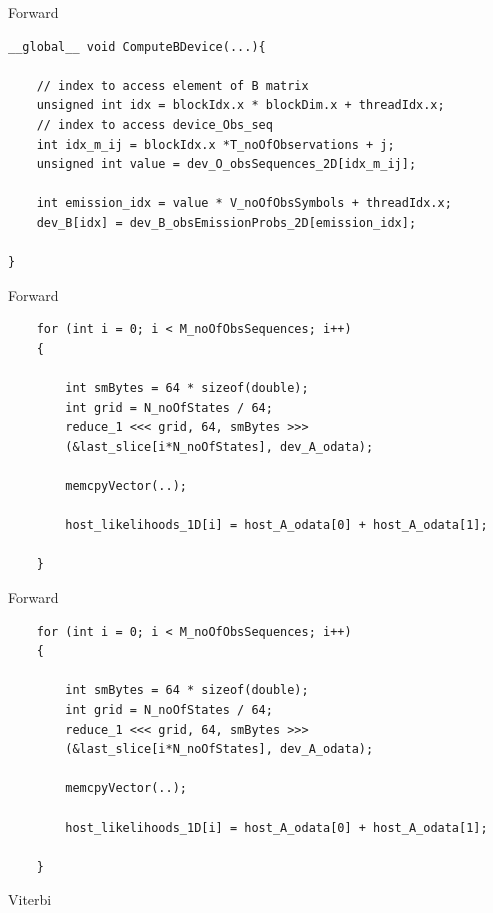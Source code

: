 \documentclass[11pt]{beamer}
\begin{document}
\begin{frame}[fragile]{Forward}
\begin{verbatim}
__global__ void ComputeBDevice(...){
	
	// index to access element of B matrix
	unsigned int idx = blockIdx.x * blockDim.x + threadIdx.x;
	// index to access device_Obs_seq
	int idx_m_ij = blockIdx.x *T_noOfObservations + j;
	unsigned int value = dev_O_obsSequences_2D[idx_m_ij];

	int emission_idx = value * V_noOfObsSymbols + threadIdx.x;
	dev_B[idx] = dev_B_obsEmissionProbs_2D[emission_idx];

}
\end{verbatim}
\end{frame}

\begin{frame}[fragile]{Forward}
\begin{verbatim}
	for (int i = 0; i < M_noOfObsSequences; i++)
	{

		int smBytes = 64 * sizeof(double);
		int grid = N_noOfStates / 64;
		reduce_1 <<< grid, 64, smBytes >>>
		(&last_slice[i*N_noOfStates], dev_A_odata);

		memcpyVector(..);

		host_likelihoods_1D[i] = host_A_odata[0] + host_A_odata[1];

	}
\end{verbatim}
\end{frame}


\begin{frame}[fragile]{Forward}
\begin{verbatim}
	for (int i = 0; i < M_noOfObsSequences; i++)
	{

		int smBytes = 64 * sizeof(double);
		int grid = N_noOfStates / 64;
		reduce_1 <<< grid, 64, smBytes >>>
		(&last_slice[i*N_noOfStates], dev_A_odata);

		memcpyVector(..);

		host_likelihoods_1D[i] = host_A_odata[0] + host_A_odata[1];

	}
\end{verbatim}
\end{frame}

\begin{frame}[fragile]{Viterbi}
	\begin{verbatim}
	
	\end{verbatim}
\end{frame}
\end{document}
